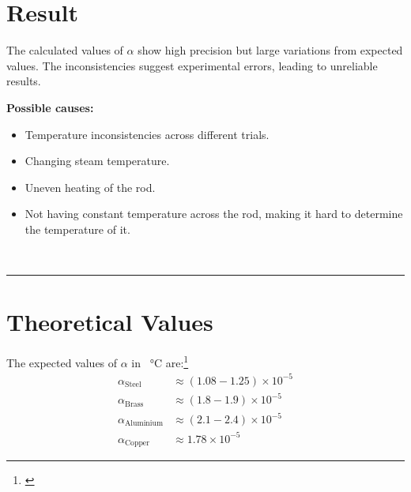 \documentclass[%
 sor,
 jor,
 amsmath,amssymb,
 reprint,
]{revtex4-2}
\begin{document}
\section{Result}
The calculated values of $\alpha$ show high precision but large variations from expected values. The inconsistencies suggest experimental errors, leading to unreliable results.

\textbf{Possible causes:}
\begin{itemize}
    \item Temperature inconsistencies across different trials.
    \item Changing steam temperature.
    \item Uneven heating of the rod.
    \item Not having constant temperature across the rod, making it hard to determine the temperature of it.
\end{itemize}



\noindent{}\\

\noindent\rule{\linewidth}{0.4pt}
\vspace{1cm}

\appendix
\section{Theoretical Values}
The expected values of $\alpha$ in \si{\per\celsius} are:\footnote{\cite{alpha}}
\[
\begin{split}
\alpha_{\text{Steel}} &\approx (1.08 - 1.25) \times 10^{-5}\\
\alpha_{\text{Brass}} &\approx (1.8 - 1.9) \times 10^{-5}\\
\alpha_{\text{Aluminium}} &\approx (2.1 - 2.4) \times 10^{-5}\\
\alpha_{\text{Copper}} &\approx 1.78 \times 10^{-5}
\end{split}
\]


\end{document}

